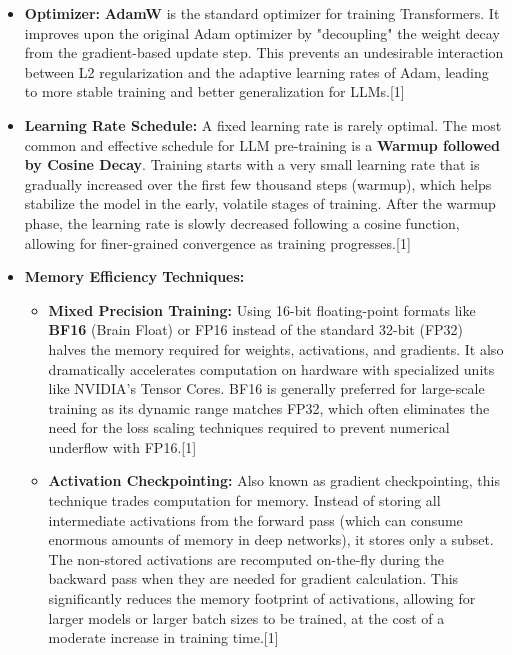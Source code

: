 \documentclass[12pt, a4paper]{article}
\begin{document}
\begin{itemize}
    \item \textbf{Optimizer:} \textbf{AdamW} is the standard optimizer for training Transformers. It improves upon the original Adam optimizer by "decoupling" the weight decay from the gradient-based update step. This prevents an undesirable interaction between L2 regularization and the adaptive learning rates of Adam, leading to more stable training and better generalization for LLMs.[1]
    \item \textbf{Learning Rate Schedule:} A fixed learning rate is rarely optimal. The most common and effective schedule for LLM pre-training is a \textbf{Warmup followed by Cosine Decay}. Training starts with a very small learning rate that is gradually increased over the first few thousand steps (warmup), which helps stabilize the model in the early, volatile stages of training. After the warmup phase, the learning rate is slowly decreased following a cosine function, allowing for finer-grained convergence as training progresses.[1]
    \item \textbf{Memory Efficiency Techniques:}
    \begin{itemize}
        \item \textbf{Mixed Precision Training:} Using 16-bit floating-point formats like \textbf{BF16} (Brain Float) or FP16 instead of the standard 32-bit (FP32) halves the memory required for weights, activations, and gradients. It also dramatically accelerates computation on hardware with specialized units like NVIDIA's Tensor Cores. BF16 is generally preferred for large-scale training as its dynamic range matches FP32, which often eliminates the need for the loss scaling techniques required to prevent numerical underflow with FP16.[1]
        \item \textbf{Activation Checkpointing:} Also known as gradient checkpointing, this technique trades computation for memory. Instead of storing all intermediate activations from the forward pass (which can consume enormous amounts of memory in deep networks), it stores only a subset. The non-stored activations are recomputed on-the-fly during the backward pass when they are needed for gradient calculation. This significantly reduces the memory footprint of activations, allowing for larger models or larger batch sizes to be trained, at the cost of a moderate increase in training time.[1]
    \end{itemize}
\end{itemize}
\end{document}
